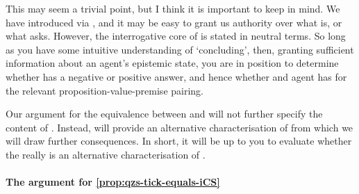 \begin{note}[Intuition]
  This may seem a trivial point, but I think it is important to keep in mind.
  We have introduced \zS{} via \qzS{}, and it may be easy to grant us authority over what \zS{} is, or what \qzS{} asks.
  However, the interrogative core of \qzS{} is stated in neutral terms.
  So long as you have some intuitive understanding of `concluding', then, granting sufficient information about an agent's epistemic state, you are in position to determine whether \qzS{} has a negative or positive answer, and hence whether and agent has \zS{} for the relevant proposition-value-premise pairing.

  Our argument for the equivalence between \zS{} and \ZS{} will not further specify the content of \qzS{}.
  Instead, \ZS{} will provide an alternative characterisation of \zS{} from which we will draw further consequences.
  In short, it will be up to you to evaluate whether the \ZS{} really is an alternative characterisation of \zS{}.
\end{note}

\paragraph*{The argument for \autoref{prop:qzs-tick-equals-iCS}}

